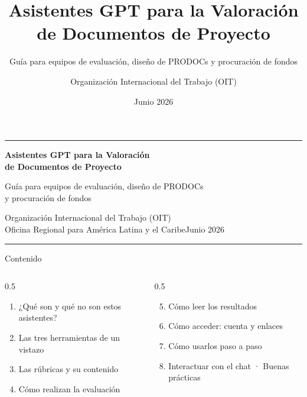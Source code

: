 \documentclass[aspectratio=169,11pt]{beamer}
\title{Asistentes GPT para la Valoración de Documentos de Proyecto}
\subtitle{Guía para equipos de evaluación, diseño de PRODOCs y procuración de fondos}
\author{Organización Internacional del Trabajo (OIT)}
\date{Junio 2026}
\begin{document}
{
\begin{frame}[plain]
  \vspace{0.6cm}
  \begin{beamercolorbox}[wd=\paperwidth,ht=1.1ex,dp=0ex]{}\color{iloRed}\rule{\paperwidth}{2pt}\end{beamercolorbox}
  \vspace{0.8cm}
  {\color{iloBlue}\Large\bfseries Asistentes GPT para la Valoración\\[2pt] de Documentos de Proyecto\par}
  \vspace{0.3cm}
  {\color{iloBlueMid}\normalsize Guía para equipos de evaluación, diseño de PRODOCs\\ y procuración de fondos\par}
  \vspace{1.0cm}
  {\color{iloGray}\small Organización Internacional del Trabajo (OIT)\\ Oficina Regional para América Latina y el Caribe\hfill Junio 2026\par}
  \vspace{0.4cm}
  \begin{beamercolorbox}[wd=\paperwidth,ht=1.1ex,dp=0ex]{}\color{iloBlue}\rule{\paperwidth}{2pt}\end{beamercolorbox}
\end{frame}}

\begin{frame}{Contenido}
  \begin{columns}[T]
    \begin{column}{0.5\textwidth}
      \begin{enumerate}
        \item ¿Qué son y qué no son estos asistentes?
        \item Las tres herramientas de un vistazo
        \item Las rúbricas y su contenido
        \item Cómo realizan la evaluación
      \end{enumerate}
    \end{column}
    \begin{column}{0.5\textwidth}
      \begin{enumerate}
        \setcounter{enumi}{4}
        \item Cómo leer los resultados
        \item Cómo acceder: cuenta y enlaces
        \item Cómo usarlos paso a paso
        \item Interactuar con el chat · Buenas prácticas
      \end{enumerate}
    \end{column}
  \end{columns}
\end{frame}
\end{document}
